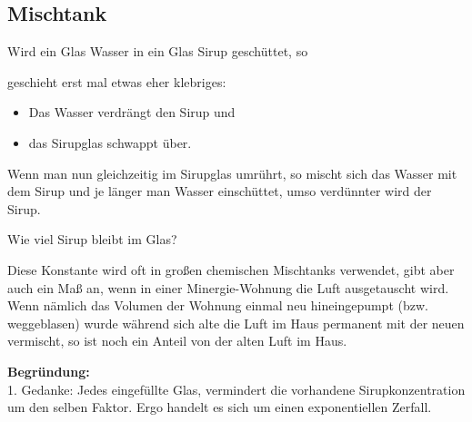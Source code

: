 \subsection{Mischtank}\label{sirup_beispiel}
Wird ein Glas Wasser in ein Glas Sirup geschüttet, so


geschieht erst mal etwas eher klebriges:
\begin{itemize}
  \item Das Wasser verdrängt den Sirup und
  \item das Sirupglas schwappt über.
\end{itemize}

Wenn man nun gleichzeitig im Sirupglas
umrührt, so mischt sich das Wasser mit dem Sirup und je länger man
Wasser einschüttet, umso verdünnter wird der Sirup.


Wie viel Sirup bleibt im Glas?


Diese Konstante wird oft in großen chemischen Mischtanks verwendet,
gibt aber auch ein Maß an, wenn \zB in einer Minergie-Wohnung die Luft
ausgetauscht wird. Wenn nämlich das Volumen der Wohnung einmal neu hineingepumpt (bzw. weggeblasen) wurde während sich alte die Luft im Haus permanent mit der neuen vermischt, so ist noch ein Anteil von  der alten Luft im Haus.
\newpage


\textbf{Begründung:}\\
1. Gedanke: Jedes eingefüllte Glas, vermindert die vorhandene
Sirupkonzentration um den selben Faktor. Ergo handelt es sich um
einen exponentiellen Zerfall.

\leserluft

